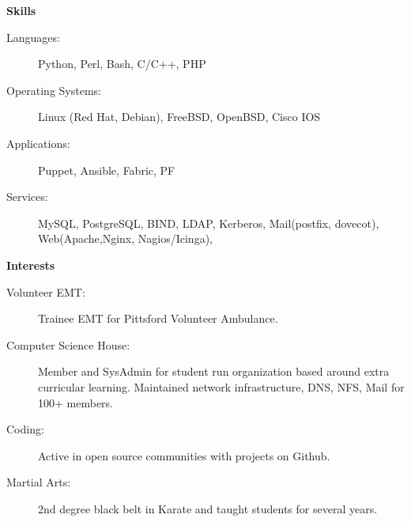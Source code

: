 \documentclass[letterpaper,11pt]{article}
\newcommand{\resheading}[1]{{\large \colorbox{mygrey}{\begin{minipage}{\textwidth}{\textbf{#1 \vphantom{p\^{E}}}}\end{minipage}}}}
\begin{document}
\resheading{Skills}

\begin{description}
\item[Languages:]
Python, Perl, Bash, C/C++, PHP
\item[Operating Systems:]
Linux (Red Hat, Debian), FreeBSD, OpenBSD, Cisco IOS
\item[Applications:]Puppet, Ansible, Fabric, PF 
\item[Services:]MySQL, PostgreSQL, BIND, LDAP, Kerberos, Mail(postfix, dovecot), Web(Apache,Nginx, Nagios/Icinga), 
\end{description}

\resheading{Interests}

\begin{description}
\item[Volunteer EMT:]Trainee EMT for Pittsford Volunteer Ambulance. 
\item[Computer Science House:] Member and SysAdmin for student run organization based around extra curricular learning. Maintained network infrastructure, DNS, NFS, Mail for 100+ members. 
\item[Coding:] Active in open source communities with projects on Github. 
\item[Martial Arts:] 2nd degree black belt in Karate and taught students for several years.

\end{description}
\end{document}
